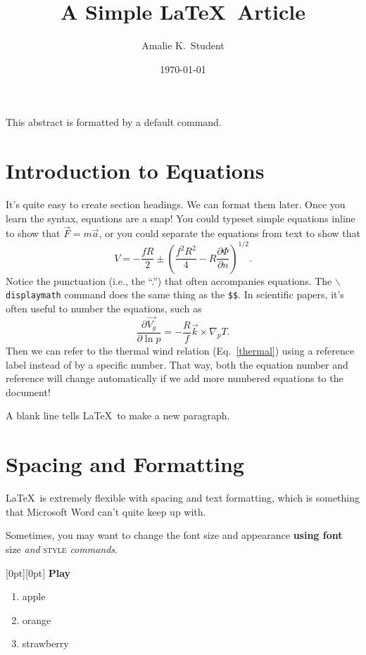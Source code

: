 \documentclass[12pt,onecolumn]{article} %
\title{A Simple \LaTeX\ Article}
\author{Amalie K.\ Student} %
\date{\today}
\begin{document}
\maketitle %

  This abstract is formatted by a default command.

\section{Introduction to Equations}
It's quite easy to create section headings.  We can format them later.  Once you learn the syntax, equations are a snap!  You could typeset simple equations inline to show that $\vec{F}=m\vec{a}$, or you could separate the equations from text to show that
$$V=-\frac{fR}{2}\pm\left(\frac{f^2R^2}{4}-R\frac{\partial\Phi}{\partial n}\right)^{1/2}.$$
Notice the punctuation (i.e., the ``.'') that often accompanies equations. The \texttt{$\backslash$displaymath} command does the same thing as the \texttt{\$\$}.
In scientific papers, it's often useful to number the equations, such as
\begin{equation}
\label{thermal}
\frac{\partial\vec{V_g}}{\partial \ln p}=-\frac{R}{f}\vec{k}\times\nabla_p T.
\end{equation}
Then we can refer to the thermal wind relation (Eq.~\ref{thermal}) using a reference label instead of by a specific number.  That way, both the equation number and reference will change automatically if we add more numbered equations to the document! 

A blank line tells \LaTeX\ to make a new paragraph.

\section{Spacing and Formatting}
\LaTeX\ is extremely flexible with spacing \hspace{5mm}
and text formatting, which is something that Microsoft Word can't quite keep up with.\\ %
\vspace{1in} %
\begin{center}
\Huge{Sometimes,}
\huge{you}
\LARGE{may}
\Large{want}
\large{to}
\normalsize{change}
\small{the}
\footnotesize{font}
\scriptsize{size}
\tiny{and appearance}
\normalsize
\textbf{using font}
\textsf{size}
\textit{and}
\textsc{style}
\textsl{commands}.
\end{center}

\vspace{10mm}
\raisebox{0pt}[0pt][0pt]{\Large%
\textbf{Play\raisebox{-0.3ex}{wi}%
\raisebox{-0.7ex}{th}%
\raisebox{-1.2ex}{t}%
\raisebox{-2.2ex}{e}%
\raisebox{-4.5ex}{x}%
\raisebox{-6.5ex}{t}}}

\begin{enumerate}
\item apple
\item orange
\item strawberry
\end{enumerate}
\end{document}
